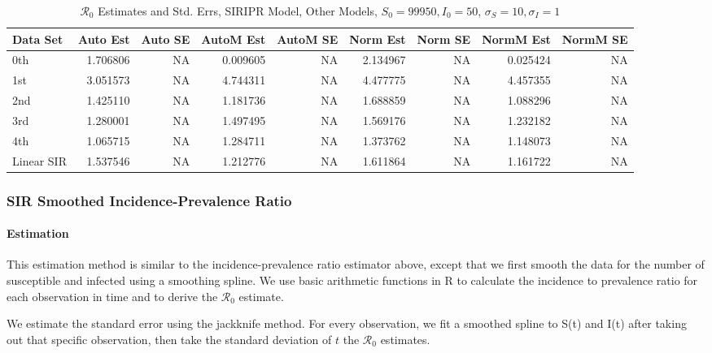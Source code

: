 \documentclass[12pt]{article}
\newcommand{\rr}{\ensuremath{\mathcal{R}_0}}
\begin{document}
\begin{table}[H]
	
	\caption{$\rr$ Estimates and Std. Errs, SIRIPR Model,
		Other Models, $S_0 = 99950, I_0 = 50$, 
		$\sigma_S = 10, \sigma_I = 1$}
	\begin{footnotesize}
		\hskip -1cm
	\begin{tabular}{l|r|r|r|r|r|r|r|r}
		\hline
		Data Set & Auto Est & Auto SE & AutoM Est & AutoM SE & Norm Est & Norm SE & NormM Est & NormM SE\\
		\hline
		0th & 1.706806 & NA & 0.009605 & NA & 2.134967 & NA & 0.025424 & NA\\
		\hline
		1st & 3.051573 & NA & 4.744311 & NA & 4.477775 & NA & 4.457355 & NA\\
		\hline
		2nd & 1.425110 & NA & 1.181736 & NA & 1.688859 & NA & 1.088296 & NA\\
		\hline
		3rd & 1.280001 & NA & 1.497495 & NA & 1.569176 & NA & 1.232182 & NA\\
		\hline
		4th & 1.065715 & NA & 1.284711 & NA & 1.373762 & NA & 1.148073 & NA\\
		\hline
		Linear SIR & 1.537546 & NA & 1.212776 & NA & 1.611864 & NA & 1.161722 & NA\\
		\hline
	\end{tabular}
\end{footnotesize}
\end{table}

\subsubsection{SIR Smoothed Incidence-Prevalence Ratio}

\paragraph{Estimation}

This estimation method is similar to the incidence-prevalence ratio estimator above, except that we first smooth the data for the number of susceptible and infected using a smoothing spline. We use basic arithmetic functions in R to calculate the incidence to prevalence ratio for each observation in time and to derive the $\rr$ estimate.

We estimate the standard error using the jackknife method. For every observation, we fit a smoothed spline to S(t) and I(t) after taking out that specific observation, then take the standard deviation of $t$ the $\rr$ estimates. 
\end{document}
